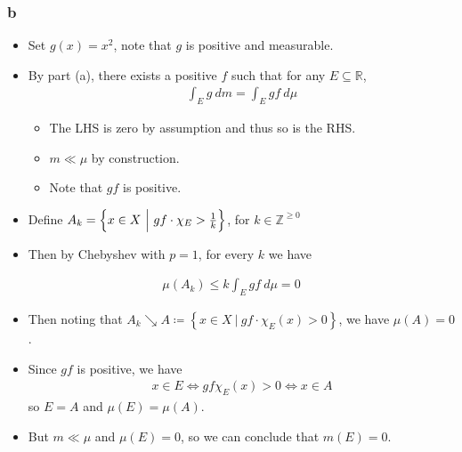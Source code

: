 \begin{solution}

\hypertarget{b-6}{%
\subsubsection{b}\label{b-6}}

\begin{itemize}
\item
  Set \(g(x) = x^2\), note that \(g\) is positive and measurable.
\item
  By part (a), there exists a positive \(f\) such that for any
  \(E\subseteq {\mathbb{R}}\),
  \begin{align*}
  \int_E g ~dm = \int_E gf ~d\mu 
  \end{align*}

  \begin{itemize}
  \item
    The LHS is zero by assumption and thus so is the RHS.
  \item
    \(m \ll \mu\) by construction.
  \item
    Note that \(gf\) is positive.
  \end{itemize}
\item
  Define
  \(A_k = \left\{{x\in X {~\mathrel{\Big|}~}gf \cdot \chi_E > {1 \over k} }\right\}\),
  for \(k\in {\mathbb{Z}}^{\geq 0}\)
\item
  Then by Chebyshev with \(p=1\), for every \(k\) we have
\end{itemize}

\begin{align*}
\mu(A_k) \leq k \int_E gf ~d\mu = 0
\end{align*}

\begin{itemize}
\item
  Then noting that
  \(A_k \searrow A \coloneqq\left\{{x\in X {~\mathrel{\Big|}~}gf\cdot \chi_E(x) > 0}\right\}\),
  we have \(\mu(A) = 0\).
\item
  Since \(gf\) is positive, we have
  \begin{align*}
  x\in E \iff gf\chi_E(x) > 0 \iff x\in A
  \end{align*}
  so \(E = A\) and \(\mu(E) = \mu(A)\).
\item
  But \(m \ll \mu\) and \(\mu(E) = 0\), so we can conclude that
  \(m(E) = 0\).
\end{itemize}

\end{solution}

